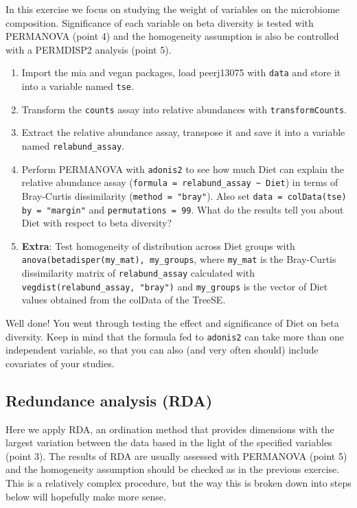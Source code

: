 \documentclass[
]{book}
\providecommand{\tightlist}{%
  \setlength{\itemsep}{0pt}\setlength{\parskip}{0pt}}
\begin{document}
In this exercise we focus on studying the weight of variables on the microbiome
composition. Significance of each variable on beta diversity is tested with
PERMANOVA (point 4) and the homogeneity assumption is also be controlled with a
PERMDISP2 analysis (point 5).

\begin{enumerate}
\def\labelenumi{\arabic{enumi}.}
\tightlist
\item
  Import the mia and vegan packages, load peerj13075 with \texttt{data} and store it
  into a variable named \texttt{tse}.
\item
  Transform the \texttt{counts} assay into relative abundances with \texttt{transformCounts}.
\item
  Extract the relative abundance assay, transpose it and save it into
  a variable named \texttt{relabund\_assay}.
\item
  Perform PERMANOVA with \texttt{adonis2} to see how much Diet can explain the relative
  abundance assay (\texttt{formula\ =\ relabund\_assay\ \textasciitilde{}\ Diet}) in terms of Bray-Curtis
  dissimilarity (\texttt{method\ =\ "bray"}). Also set \texttt{data\ =\ colData(tse)}
  \texttt{by\ =\ "margin"} and \texttt{permutations\ =\ 99}. What do the results tell you about
  Diet with respect to beta diversity?
\item
  \textbf{Extra}: Test homogeneity of distribution across Diet groups with
  \texttt{anova(betadisper(my\_mat),\ my\_groups}, where \texttt{my\_mat} is the Bray-Curtis
  dissimilarity matrix of \texttt{relabund\_assay} calculated with
  \texttt{vegdist(relabund\_assay,\ "bray")} and \texttt{my\_groups} is the vector of Diet values
  obtained from the colData of the TreeSE.
\end{enumerate}

Well done! You went through testing the effect and significance of Diet on beta
diversity. Keep in mind that the formula fed to \texttt{adonis2} can take more than one
independent variable, so that you can also (and very often should) include
covariates of your studies.

\hypertarget{redundance-analysis-rda}{%
\subsection{Redundance analysis (RDA)}\label{redundance-analysis-rda}}

Here we apply RDA, an ordination method that provides dimensions with
the largest variation between the data based in the light of the specified
variables (point 3). The results of RDA are usually assessed with PERMANOVA
(point 5) and the homogeneity assumption should be checked as in the previous
exercise. This is a relatively complex procedure, but the way this is broken
down into steps below will hopefully make more sense.
\end{document}
